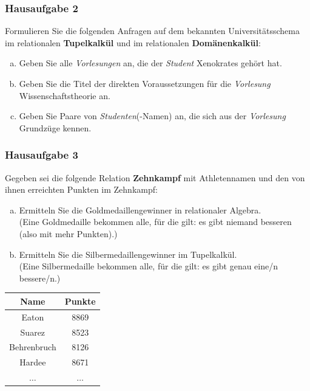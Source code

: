 \begin{frame}
	\frametitle{Hausaufgabe 2}
	\vspace{0.5cm}

	Formulieren Sie die folgenden Anfragen auf dem bekannten Universitätsschema im
	relationalen \textbf{Tupelkalkül} und im relationalen \textbf{Domänenkalkül}:
	\begin{enumerate}[a)]
		\item Geben Sie alle \textit{Vorlesungen} an, die der \textit{Student} Xenokrates gehört hat.
		\item Geben Sie die Titel der direkten Voraussetzungen für die \textit{Vorlesung} Wissenschaftstheorie an.
		\item Geben Sie Paare von \textit{Studenten}(-Namen) an, die sich aus der \textit{Vorlesung} Grundzüge kennen.
	\end{enumerate}
\end{frame}

\begin{frame}
	\frametitle{Hausaufgabe 3}
	\vspace{0.5cm}

	Gegeben sei die folgende Relation \textbf{Zehnkampf} mit Athletennamen und den von ihnen erreichten Punkten im Zehnkampf:

	\begin{enumerate}[a)]
		\item Ermitteln Sie die Goldmedaillengewinner in relationaler Algebra. \\
		      (Eine Goldmedaille bekommen alle, für die gilt: es gibt niemand besseren (also mit mehr Punkten).)
		\item Ermitteln Sie die Silbermedaillengewinner im Tupelkalkül. \\
		      (Eine Silbermedaille bekommen alle, für die gilt: es gibt genau eine/n bessere/n.)
	\end{enumerate}
	\begin{table}[]
		\begin{tabular}{c|c}
			Name         & Punkte       \\ \hline
			Eaton        & 8869         \\
			Suarez       & 8523         \\
			Behrenbruch  & 8126         \\
			Hardee       & 8671         \\
			\( \hdots \) & \( \hdots \)
		\end{tabular}
	\end{table}
\end{frame}

